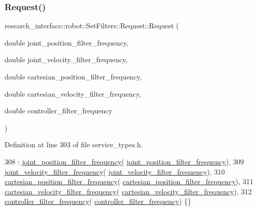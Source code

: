 \subsubsection{\texorpdfstring{Request()}{Request()}}
{\footnotesize\ttfamily research\+\_\+interface\+::robot\+::\+Set\+Filters\+::\+Request\+::\+Request (\begin{DoxyParamCaption}\item[{double}]{joint\+\_\+position\+\_\+filter\+\_\+frequency,  }\item[{double}]{joint\+\_\+velocity\+\_\+filter\+\_\+frequency,  }\item[{double}]{cartesian\+\_\+position\+\_\+filter\+\_\+frequency,  }\item[{double}]{cartesian\+\_\+velocity\+\_\+filter\+\_\+frequency,  }\item[{double}]{controller\+\_\+filter\+\_\+frequency }\end{DoxyParamCaption})\hspace{0.3cm}{\ttfamily [inline]}}



Definition at line 303 of file service\+\_\+types.\+h.


\begin{DoxyCode}
308         : \hyperlink{structresearch__interface_1_1robot_1_1SetFilters_1_1Request_a860f89da9defdcc600d13ecf9f48593f}{joint\_position\_filter\_frequency}(
      \hyperlink{structresearch__interface_1_1robot_1_1SetFilters_1_1Request_a860f89da9defdcc600d13ecf9f48593f}{joint\_position\_filter\_frequency}),
309           \hyperlink{structresearch__interface_1_1robot_1_1SetFilters_1_1Request_a5da8f47649157c38440941e8a55eb263}{joint\_velocity\_filter\_frequency}(
      \hyperlink{structresearch__interface_1_1robot_1_1SetFilters_1_1Request_a5da8f47649157c38440941e8a55eb263}{joint\_velocity\_filter\_frequency}),
310           \hyperlink{structresearch__interface_1_1robot_1_1SetFilters_1_1Request_a9b718eefa760ad1ef370c41a4573e504}{cartesian\_position\_filter\_frequency}(
      \hyperlink{structresearch__interface_1_1robot_1_1SetFilters_1_1Request_a9b718eefa760ad1ef370c41a4573e504}{cartesian\_position\_filter\_frequency}),
311           \hyperlink{structresearch__interface_1_1robot_1_1SetFilters_1_1Request_add0117259ca298a78e3f51784a5eed26}{cartesian\_velocity\_filter\_frequency}(
      \hyperlink{structresearch__interface_1_1robot_1_1SetFilters_1_1Request_add0117259ca298a78e3f51784a5eed26}{cartesian\_velocity\_filter\_frequency}),
312           \hyperlink{structresearch__interface_1_1robot_1_1SetFilters_1_1Request_a0722f3d1bcfbd280c440f1a0762d9541}{controller\_filter\_frequency}(
      \hyperlink{structresearch__interface_1_1robot_1_1SetFilters_1_1Request_a0722f3d1bcfbd280c440f1a0762d9541}{controller\_filter\_frequency}) \{\}
\end{DoxyCode}


